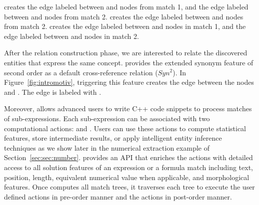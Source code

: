  creates the 
edge labeled  between  and 
 nodes from match 1, and the 
edge labeled  between  and  nodes from match 2.
 creates the edge labeled  
between  and  nodes from match 2. 
 creates the edge labeled  
between  and  nodes in 
match 1, and the 
edge labeled  between  and  
nodes in match 2.

After the relation construction phase, we are interested to relate the discovered entities
that express the same concept.
\framework provides the extended synonym feature of second order as a default cross-reference relation ($Syn^2$).
In Figure~\ref{fig:intromotiv}, triggering this feature creates the edge between the nodes  and .
The edge is labeled with .

Moreover, \framework allows advanced users to write C++ code snippets 
to process matches of sub-expressions.
Each sub-expression can be associated with two computational actions:  and .
Users can use these actions to compute statistical features, 
store intermediate results, 
or apply intelligent entity inference techniques
as we show later in the numerical extraction example of Section~\ref{sec:sec:number}.
\framework provides an API that enriches the actions with detailed access to
all solution features of an expression or a formula match including 
text, position, length, equivalent numerical value when applicable, 
and morphological features.
Once \framework computes all match trees, it traverses each tree to 
execute the user defined  actions in pre-order manner
and the  actions in post-order manner.

